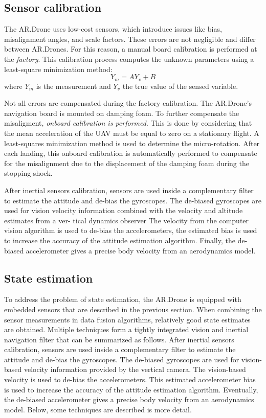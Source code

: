 \subsection{Sensor calibration}
The AR.Drone uses low-cost sensors, which introduce issues like bias, misalignment angles, and scale factors.
These errors are not negligible and differ between AR.Drones.
For this reason, a manual board calibration is performed at the \textit{factory}.
This calibration process computes the unknown parameters using a least-square minimization method:
\begin{equation}
Y_m = AY_v + B
\end{equation}
where $Y_m$ is the measurement and $Y_v$ the true value of the sensed variable.

Not all errors are compensated during the factory calibration.
The AR.Drone's navigation board is mounted on damping foam.
To further compensate the misaligment, \textit{onboard calibration is performed}.
This is done by considering that the mean acceleration of the UAV must be equal to zero on a stationary flight.
A least-squares minimization method is used to determine the micro-rotation.
After each landing, this onboard calibration is automatically performed to compensate for the misalignment due to the displacement of the damping foam during the stopping shock.

After inertial sensors calibration, sensors are used inside a complementary filter to estimate the attitude and de-bias the gyroscopes.
The de-biased gyroscopes are used for vision velocity information combined with the velocity and altitude estimates from a ver- tical dynamics observer
The velocity from the computer vision algorithm is used to de-bias the accelerometers, the estimated bias is used to increase the accuracy of the attitude estimation algorithm.
Finally, the de-biased accelerometer gives a precise body velocity from an aerodynamics model.


\subsection{State estimation}
To address the problem of state estimation, the AR.Drone is equipped with embedded sensors that are described in the previous section.
When combining the sensor measurements in data fusion algorithms, relatively good state estimates are obtained.
Multiple techniques form a tightly integrated vision and inertial navigation filter that can be summarized as follows.
After inertial sensors calibration, sensors are used inside a complementary filter to estimate the attitude and de-bias the gyroscopes.
The de-biased gyroscopes are used for vision-based velocity information provided by the vertical camera.
The vision-based velocity is used to de-bias the accelerometers. This estimated accelerometer bias is used to increase the accuracy of the attitude estimation algorithm.
Eventually, the de-biased accelerometer gives a precise body velocity from an aerodynamics model.
Below, some techniques are described is more detail.

